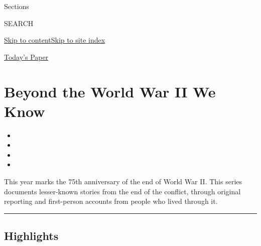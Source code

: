 Sections

SEARCH

\protect\hyperlink{site-content}{Skip to
content}\protect\hyperlink{site-index}{Skip to site index}

\href{https://myaccount.nytimes.com/auth/login?response_type=cookie\&client_id=vi}{}

\href{https://www.nytimes.com/section/todayspaper}{Today's Paper}

\hypertarget{beyond-the-world-war-ii-we-know}{%
\section{Beyond the World War II We
Know}\label{beyond-the-world-war-ii-we-know}}

\begin{itemize}
\item
\item
\item
\item
\end{itemize}

This year marks the 75th anniversary of the end of World War II. This
series documents lesser-known stories from the end of the conflict,
through original reporting and first-person accounts from people who
lived through it.

\begin{center}\rule{0.5\linewidth}{\linethickness}\end{center}

\hypertarget{highlights}{%
\subsection{Highlights}\label{highlights}}

